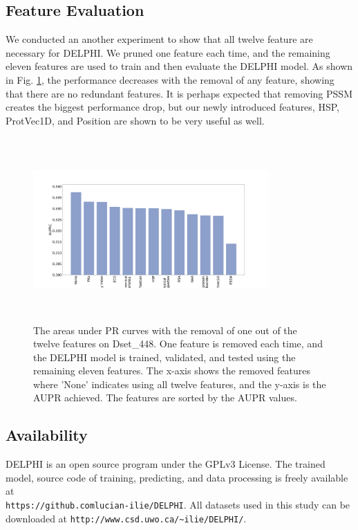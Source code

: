 \subsection{Feature Evaluation}
We conducted an another experiment to show that all twelve feature are necessary for DELPHI. We pruned one feature each time, and the remaining eleven features are used to train and then evaluate the DELPHI model. As shown in Fig. \ref{fig_remove_each_feature}, the performance decreases with the removal of any feature, showing that there are no redundant features. It is perhaps expected that  removing PSSM creates the biggest performance drop, but our newly introduced features, HSP, ProtVec1D, and Position are shown to be  very useful as well. 
\begin{figure}[!h]
\begin{center}
\includegraphics[height = 7cm, width = 9cm]{img/remove_features_individually_Testing.pdf}
\caption{The areas under PR curves with the removal of one out of the twelve features on Dset\_448. One feature is removed each time, and the DELPHI model is trained, validated, and tested using the remaining eleven features. The x-axis shows the removed features where 'None' indicates using all twelve features, and the y-axis is the AUPR achieved. The features are sorted by the AUPR values. } \label{fig_remove_each_feature}
\end{center}
\end{figure}

\subsection{Availability}
DELPHI is an open source program under the GPLv3 License. The trained model, source code of training, predicting, and data processing is freely available at\\ \texttt{https://github.comlucian-ilie/DELPHI}. 
All datasets used in this study can be downloaded at \texttt{http://www.csd.uwo.ca/\~{}ilie/DELPHI/}.\\
